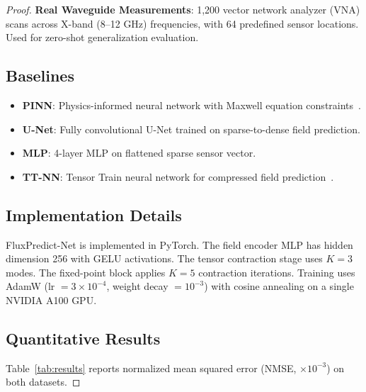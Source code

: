 \documentclass[12pt]{article}
\begin{document}
\begin{proof}
\textbf{Real Waveguide Measurements}: 1,200 vector network analyzer (VNA) scans across X-band (8--12 GHz) frequencies, with 64 predefined sensor locations. Used for zero-shot generalization evaluation.

\subsection{Baselines}

\begin{itemize}
    \item \textbf{PINN}: Physics-informed neural network with Maxwell equation constraints~\cite{raissi2019physics}.
    \item \textbf{U-Net}: Fully convolutional U-Net trained on sparse-to-dense field prediction.
    \item \textbf{MLP}: 4-layer MLP on flattened sparse sensor vector.
    \item \textbf{TT-NN}: Tensor Train neural network for compressed field prediction~\cite{novikov2015tensorizing}.
\end{itemize}

\subsection{Implementation Details}

FluxPredict-Net is implemented in PyTorch. The field encoder MLP has hidden dimension 256 with GELU activations. The tensor contraction stage uses $K=3$ modes. The fixed-point block applies $K=5$ contraction iterations. Training uses AdamW (lr $= 3 \times 10^{-4}$, weight decay $= 10^{-3}$) with cosine annealing on a single NVIDIA A100 GPU.

\subsection{Quantitative Results}

Table~\ref{tab:results} reports normalized mean squared error (NMSE, $\times 10^{-3}$) on both datasets.


\end{proof}
\end{document}
